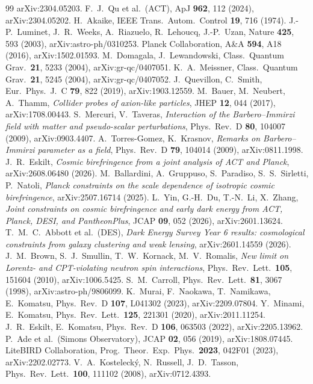 \documentclass[11pt]{article}
\begin{document}
\begin{thebibliography}{99}
  arXiv:2304.05203.
 F.~J.~Qu et al.\ (ACT), ApJ \textbf{962}, 112 (2024), arXiv:2304.05202.
 H.~Akaike, IEEE Trans.\ Autom.\ Control \textbf{19}, 716 (1974).
 J.-P.~Luminet, J.~R.~Weeks, A.~Riazuelo, R.~Lehoucq, J.-P.~Uzan,
  Nature \textbf{425}, 593 (2003), arXiv:astro-ph/0310253.
 Planck Collaboration, A\&A \textbf{594}, A18 (2016), arXiv:1502.01593.
 M.~Domagala, J.~Lewandowski, Class.\ Quantum Grav.\ \textbf{21}, 5233
  (2004), arXiv:gr-qc/0407051.
 K.~A.~Meissner, Class.\ Quantum Grav.\ \textbf{21}, 5245 (2004),
  arXiv:gr-qc/0407052.
 J.~Quevillon, C.~Smith, Eur.\ Phys.\ J.\ C \textbf{79}, 822 (2019),
  arXiv:1903.12559.
 M.~Bauer, M.~Neubert, A.~Thamm, \emph{Collider probes of axion-like particles}, JHEP
  \textbf{12}, 044 (2017), arXiv:1708.00443.
 S.~Mercuri, V.~Taveras, \emph{Interaction of the Barbero--Immirzi field with matter and
  pseudo-scalar perturbations}, Phys.\ Rev.\ D \textbf{80}, 104007 (2009), arXiv:0903.4407.
 A.~Torres-Gomez, K.~Krasnov, \emph{Remarks on Barbero--Immirzi parameter as a field},
  Phys.\ Rev.\ D \textbf{79}, 104014 (2009), arXiv:0811.1998.
 J.~R.~Eskilt, \emph{Cosmic birefringence from a joint analysis of ACT and Planck},
  arXiv:2608.06480 (2026).
 M.~Ballardini, A.~Gruppuso, S.~Paradiso, S.~S.~Sirletti, P.~Natoli, \emph{Planck
  constraints on the scale dependence of isotropic cosmic birefringence}, arXiv:2507.16714 (2025).
 L.~Yin, G.-H.~Du, T.-N.~Li, X.~Zhang, \emph{Joint constraints on cosmic birefringence and early
  dark energy from ACT, Planck, DESI, and PantheonPlus}, JCAP \textbf{09}, 052 (2026), arXiv:2601.13624.
 T.~M.~C.~Abbott et al.\ (DES), \emph{Dark Energy Survey Year 6 results: cosmological constraints
  from galaxy clustering and weak lensing}, arXiv:2601.14559 (2026).
 J.~M.~Brown, S.~J.~Smullin, T.~W.~Kornack, M.~V.~Romalis, \emph{New limit on Lorentz- and
  CPT-violating neutron spin interactions}, Phys.\ Rev.\ Lett.\ \textbf{105}, 151604 (2010), arXiv:1006.5425.
 S.~M.~Carroll, Phys.\ Rev.\ Lett.\ \textbf{81}, 3067 (1998),
  arXiv:astro-ph/9806099.
 K.~Murai, F.~Naokawa, T.~Namikawa, E.~Komatsu, Phys.\ Rev.\ D
  \textbf{107}, L041302 (2023), arXiv:2209.07804.
 Y.~Minami, E.~Komatsu, Phys.\ Rev.\ Lett.\ \textbf{125}, 221301 (2020),
  arXiv:2011.11254.
 J.~R.~Eskilt, E.~Komatsu, Phys.\ Rev.\ D \textbf{106}, 063503 (2022),
  arXiv:2205.13962.
 P.~Ade et al.\ (Simons Observatory), JCAP \textbf{02}, 056 (2019),
  arXiv:1808.07445.
 LiteBIRD Collaboration, Prog.\ Theor.\ Exp.\ Phys.\ \textbf{2023},
  042F01 (2023), arXiv:2202.02773.
 V.~A.~Kosteleck\'y, N.~Russell, J.~D.~Tasson, Phys.\ Rev.\ Lett.\
  \textbf{100}, 111102 (2008), arXiv:0712.4393.
\end{thebibliography}
\end{document}
